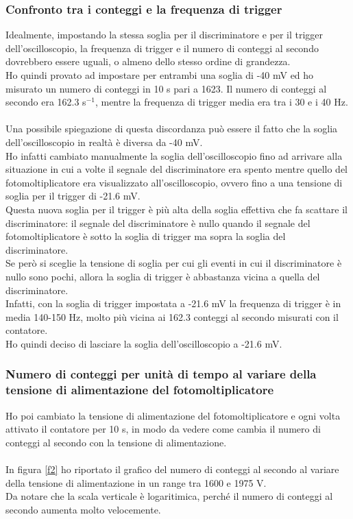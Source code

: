 \documentclass{article}
\begin{document}
\subsubsection{Confronto tra i conteggi e la frequenza di trigger} Idealmente, impostando la stessa soglia per il discriminatore e per il trigger dell'oscilloscopio, la frequenza di trigger e il numero di conteggi al secondo dovrebbero essere uguali, o almeno dello stesso ordine di grandezza. \\
Ho quindi provato ad impostare per entrambi una soglia di -40 mV ed ho misurato un numero di conteggi in 10 s pari a 1623. Il numero di conteggi al secondo era 162.3 s$^{-1}$, mentre la frequenza di trigger media era tra i 30 e i 40 Hz. \\
\\
Una possibile spiegazione di questa discordanza può essere il fatto che la soglia dell'oscilloscopio in realtà è diversa da -40 mV. \\Ho infatti cambiato manualmente la soglia dell'oscilloscopio fino ad arrivare alla situazione in cui a volte il segnale del discriminatore era spento mentre quello del fotomoltiplicatore era visualizzato all'oscilloscopio, ovvero fino a una tensione di soglia per il trigger di -21.6 mV. \\ Questa nuova soglia per il trigger è più alta della soglia effettiva che fa scattare il discriminatore: il segnale del discriminatore è nullo quando il segnale del fotomoltiplicatore è sotto la soglia di trigger ma sopra la soglia del discriminatore. \\Se però si sceglie la tensione di soglia per cui gli eventi in cui il discriminatore è nullo sono pochi, allora la soglia di trigger è abbastanza vicina a quella del discriminatore.\\
Infatti, con la soglia di trigger impostata a -21.6 mV la frequenza di trigger è in media 140-150 Hz, molto più vicina ai 162.3 conteggi al secondo misurati con il contatore.
\\
Ho quindi deciso di lasciare la soglia dell'oscilloscopio a -21.6 mV.
\newpage
\subsubsection{Numero di conteggi per unità di tempo al variare della tensione di alimentazione del fotomoltiplicatore}

Ho poi cambiato la tensione di alimentazione del fotomoltiplicatore e ogni volta attivato il contatore per 10 s, in modo da vedere come cambia il numero di conteggi al secondo con la tensione di alimentazione. \\
\\
In figura \ref{f2} ho riportato il grafico del numero di conteggi al secondo al variare della tensione di alimentazione in un range tra 1600 e 1975 V. \\
Da notare che la scala verticale è logaritimica, perché il numero di conteggi al secondo aumenta molto velocemente. 
\end{document}
